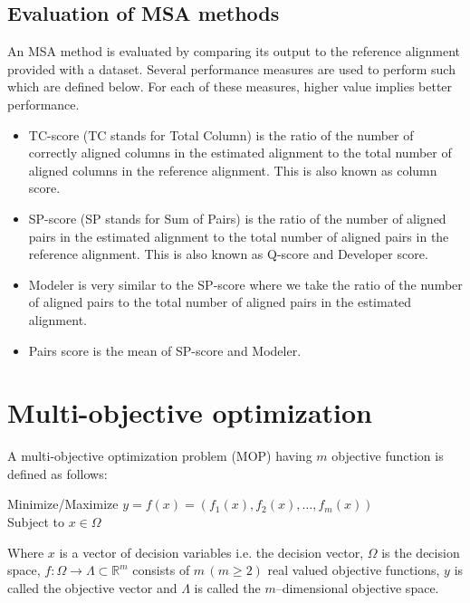 \subsection{Evaluation of MSA methods}
An MSA method is evaluated by comparing its output to the reference alignment provided with a dataset. Several performance measures are used to perform such which are defined below. For each of these measures, higher value implies better performance.
\begin{itemize}
	\item TC-score (TC stands for Total Column) is the ratio of the number of correctly aligned columns in the estimated alignment to the total number of aligned columns in the reference alignment. This is also known as column score.
	
	\item SP-score (SP stands for Sum of Pairs) is the ratio of the number of aligned pairs in the estimated alignment to the total number of aligned pairs in the reference alignment. This is also known as Q-score and Developer score.
	
	\item Modeler is very similar to the SP-score where we take the ratio of the number of aligned pairs to the total number of aligned pairs in the estimated alignment.
	
	\item Pairs score is the mean of SP-score and Modeler.   %
\end{itemize}


\section{Multi-objective optimization}
\label{sec:MaOEA_background}
A multi-objective optimization problem (MOP) having $m$ objective function is defined as follows:
\begin{center}
	Minimize/Maximize $y = f(x) = (f_1(x), f_2(x),\dots,f_m(x))$\\
	Subject to $x \in \Omega$
\end{center}

Where $x$ is a vector of decision variables i.e. the decision vector, $\Omega$ is the decision  space, $f:\Omega \rightarrow \Lambda \subset \mathbb{R}^m $ consists of $ m \, (m \ge 2) $ real valued objective functions, $y$ is called the objective vector and $\Lambda$ is called the $m$--dimensional objective space.  

